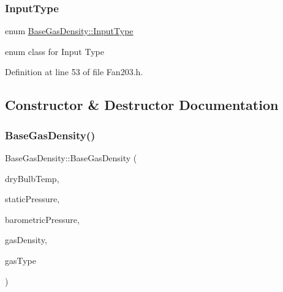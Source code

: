 \mbox{\label{class_base_gas_density_a54f846cc4683a49d3904a40fe2986772}} 
\subsubsection{\texorpdfstring{Input\+Type}{InputType}\hspace{0.1cm}{\footnotesize\ttfamily [3/3]}}
{\footnotesize\ttfamily enum \hyperlink{class_base_gas_density_a54f846cc4683a49d3904a40fe2986772}{Base\+Gas\+Density\+::\+Input\+Type}\hspace{0.3cm}{\ttfamily [strong]}}

enum class for Input Type 

Definition at line 53 of file Fan203.\+h.



\subsection{Constructor \& Destructor Documentation}
\mbox{\label{class_base_gas_density_a84089ddd9d29649d83a7b150b711b989}} 
\subsubsection{\texorpdfstring{Base\+Gas\+Density()}{BaseGasDensity()}\hspace{0.1cm}{\footnotesize\ttfamily [1/6]}}
{\footnotesize\ttfamily Base\+Gas\+Density\+::\+Base\+Gas\+Density (\begin{DoxyParamCaption}\item[{const double}]{dry\+Bulb\+Temp,  }\item[{const double}]{static\+Pressure,  }\item[{const double}]{barometric\+Pressure,  }\item[{const double}]{gas\+Density,  }\item[{const \hyperlink{class_base_gas_density_afb215e48f6193462521b7e8d47306ed3}{Gas\+Type}}]{gas\+Type }\end{DoxyParamCaption})\hspace{0.3cm}{\ttfamily [inline]}}


